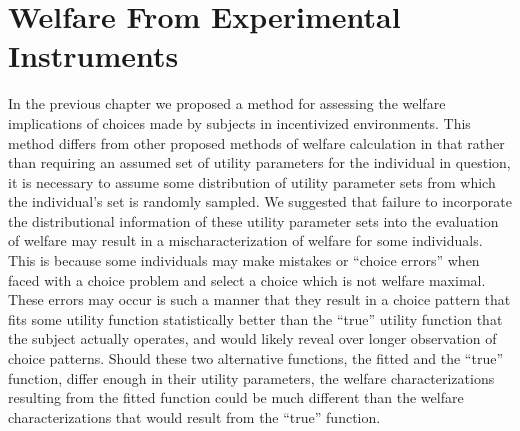 \documentclass[../main.tex]{subfiles}
\begin{document}
\onehalfspacing
\setcounter{chapter}{3}

\chapter{Welfare From Experimental Instruments}

\lltoc %

In the previous chapter we proposed a method for assessing the welfare implications of choices made by subjects in incentivized environments.
This method differs from other proposed methods of welfare calculation in that rather than requiring an assumed set of utility parameters for the individual in question, it is necessary to assume some distribution of utility parameter sets from which the individual's set is randomly sampled.
We suggested that failure to incorporate the distributional information of these utility parameter sets into the evaluation of welfare may result in a mischaracterization of welfare for some individuals.
This is because some individuals may make mistakes or \enquote{choice errors} when faced with a choice problem and select a choice which is not welfare maximal.
These errors may occur is such a manner that they result in a choice pattern that fits some utility function statistically better than the \enquote{true} utility function that the subject actually operates, and would likely reveal over longer observation of choice patterns.
Should these two alternative functions, the fitted and the \enquote{true} function, differ enough in their utility parameters, the welfare characterizations resulting from the fitted function could be much different than the welfare characterizations that would result from the \enquote{true} function.{\footnotemark}

\addtocounter{footnote}{-1}
\end{document}
